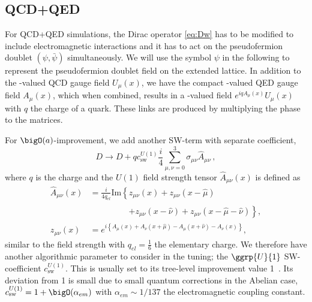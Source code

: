 \subsection{QCD+QED}

For QCD+QED simulations, the Dirac operator \cref{eq:Dw} has to be modified to include electromagnetic interactions and it has to act on the pseudofermion doublet $(\psi, \bar{\psi})$ simultaneously.
We will use the symbol $\psi$ in the following to represent the pseudofermion doublet field on the extended lattice.
In addition to the -valued QCD gauge field $U_\mu(x)$, we have the compact -valued QED gauge field $A_\mu(x)$, which when combined, results in a -valued field $e^{i q A_\mu(x)} U_\mu(x)$ with $q$ the charge of a quark.
These links are produced by multiplying the  phase to the  matrices.

For $\bigO(a)$-improvement, we add another SW-term with separate coefficient,
\begin{equation} \label{eq:Dw2}
D \rightarrow D + q c_\mathrm{sw}^{U(1)} \frac{i}{4} \sum_{\mu,\nu=0}^3 \sigma_{\mu \nu} \hat{A}_{\mu \nu}\,,
\end{equation}
where $q$ is the charge and the $U(1)$ field strength tensor $\hat{A}_{\mu \nu}(x)$ is defined as
\begin{align*}
\hat{A}_{\mu \nu}(x) &= \frac{i}{4 q_{el}} \text{Im} \left\{
      z_{\mu \nu}(x)
    + z_{\mu \nu}(x-\hat{\mu})
    \right. \\
    &\phantom{=\frac{i}{4 q_{\text{el}}} \text{Im} \left\{ \right.} \left. 
    + z_{\mu \nu}(x-\hat{\nu})
    + z_{\mu \nu}(x-\hat{\mu}-\hat{\nu})
\right\}, \\
z_{\mu \nu}(x) &= e^{i\left\{
      A_{\mu}(x)
    + A_{\nu}(x+\hat{\mu})
    - A_{\mu}(x+\hat{\nu})
    - A_{\nu}(x)
\right\}},
\end{align*}
similar to the  field strength with $q_{el} = \frac{1}{6}$ the elementary charge.
We therefore have another algorithmic parameter to consider in the tuning; the $\ggrp{U}{1}$ SW-coefficient $c_\mathrm{sw}^{U(1)}$.
This is usually set to its tree-level improvement value \num{1}~\cite{RCstar22}.
Its deviation from \num{1} is small due to small quantum corrections in the Abelian case, $c_\mathrm{sw}^{U(1)} = 1 + \bigO(\alpha_{em})$ with $\alpha_{em} \sim 1/137$ the electromagnetic coupling constant.

